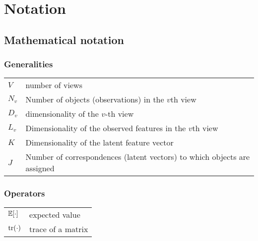 
\inbpdocument



\renewcommand{\chaptermark}[1]{\markboth{#1}{}}


\chapter*{Notation}
\label{ch:notation}
\chaptermark{Notation}
\section*{\large Mathematical notation}

\subsection*{Generalities}

\begin{tabular}{m{3cm}m{12cm}}
$V$ & number of views\\
$N_v$ & Number of objects (observations) in the $v$th view\\
$D_v$ & dimensionality of the $v$-th view\\
$L_v$ & Dimensionality of the observed features in the $v$th view\\
$K$ & Dimensionality of the latent feature vector \\
$J$ & Number of correspondences (latent vectors) to which objects are assigned\\
\end{tabular}

\subsection*{Operators}

\begin{tabular}{m{3cm}m{12cm}}
	$\operatorname{\mathbb{E}}[\cdot]$ & expected value\\
	$\operatorname{tr}(\cdot)$ & trace of a matrix\\
\end{tabular}

